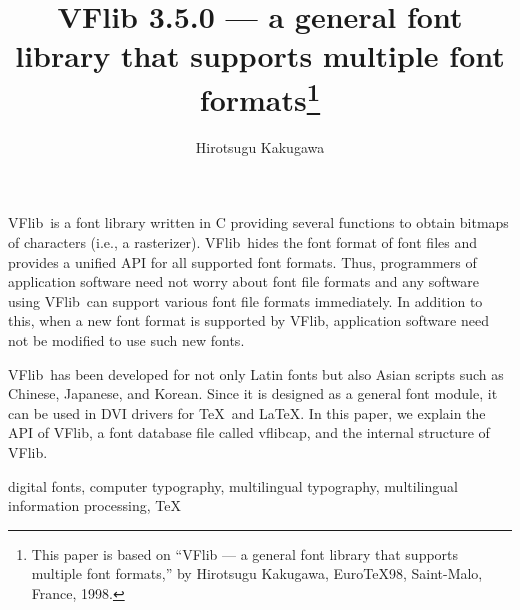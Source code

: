\documentclass{cah-gut}
\newcommand{\pkg}[1]{\textsf{#1}}
\newcommand{\VFlib}{\pkg{VFlib}}
\newcommand{\vflibcap}{\pkg{vflibcap}}
\begin{document}


\title{VFlib 3.5.0 --- a general font library that
       supports multiple font formats\footnote{
          This paper is based on 
          ``VFlib --- a general font library that
             supports multiple font formats,'' by Hirotsugu Kakugawa,
           Euro\TeX 98, Saint-Malo, France, 1998.}
       }
\author{Hirotsugu Kakugawa}
\titlehead{A font library VFlib 3.5.0}
\maketitle



\begin{Abstract}
  \VFlib\ is a font library written in C providing several functions
  to obtain bitmaps of characters (i.e., a rasterizer).
  \VFlib\ hides the font format of font files and provides a unified API 
  for all supported font formats.  
  Thus, programmers of application software need not worry
  about font file formats and  any software using \VFlib\ 
  can support various font file formats immediately.  In addition to
  this, when a new font format is supported by \VFlib, application
  software need not be modified to use such new fonts.
  
  \VFlib\ has been developed for not only Latin fonts but also Asian
  scripts such as Chinese, Japanese, and Korean.  Since it is designed
  as a general font module, it can be used in DVI drivers for \TeX\ 
  and \LaTeX.   In this paper, we explain the API of \VFlib, a font 
  database file called \vflibcap, and the internal structure of \VFlib.
\end{Abstract}



\begin{Keywords}
  digital fonts, computer typography, multilingual typography, 
  multilingual information processing, \TeX
\end{Keywords}
\end{document}
